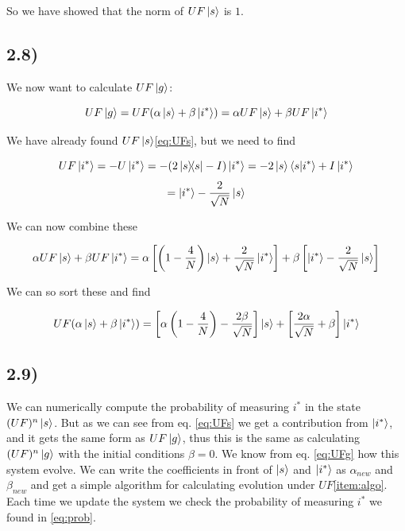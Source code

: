 \documentclass[a4paper,norsk, 10pt]{article}
\begin{document}
So we have showed that the norm of $UF\ket{s}$ is $1$.


\subsection{2.8)}

We now want to calculate $UF\ket{g}$:

\begin{equation}
UF\ket{g} = UF(\alpha\ket{s} + \beta\ket{i^*}) = \alpha UF\ket{s} + \beta UF\ket{i^*}
\end{equation}

We have already found $UF\ket{s}$\eqref{eq:UFs}, but we need to find

\begin{equation}
UF\ket{i^*} = -U\ket{i^*} = -(2\ketbra{s}{s} - I)\ket{i^*} = -2\ket{s}\braket{s}{i^*} + I\ket{i^*}
\end{equation}
\begin{equation}
= \ket{i^*} - \frac{2}{\sqrt{N}}\ket{s}
\end{equation}


We can now combine these

\begin{equation}
\alpha UF\ket{s} + \beta UF\ket{i^*} = \alpha\left[\left(1 - \frac{4}{N}\right)\ket{s} + \frac{2}{\sqrt{N}}\ket{i^*} \right] + \beta\left[\ket{i^*} - \frac{2}{\sqrt{N}}\ket{s}\right]
\end{equation}

We can so sort these and find 

\begin{equation}
UF(\alpha\ket{s} + \beta\ket{i^*}) = \left[\alpha\left(1 - \frac{4}{N}\right) - \frac{2\beta}{\sqrt{N}}\right]\ket{s} + \left[\frac{2\alpha}{\sqrt{N}} + \beta\right]\ket{i^*}
\end{equation}\label{eq:UFg}

\subsection{2.9)}

We can numerically compute the probability of measuring $i^*$ in the state $(UF)^n\ket{s}$. But as we can see from eq. \eqref{eq:UFs} we get a contribution from $\ket{i^*}$, and it gets the same form as $UF\ket{g}$, thus this is the same as calculating $(UF)^n\ket{g}$ with the initial conditions $\beta = 0$. We know from eq. \ref{eq:UFg} how this system evolve. We can write the coefficients in front of $\ket{s}$ and $\ket{i^*}$ as $\alpha_{new}$ and $\beta_{new}$ and get a simple algorithm for calculating evolution under $UF$\eqref{item:algo}. Each time we update the system we check the probability of measuring $i^*$ we found in \eqref{eq:prob}.
\end{document}
